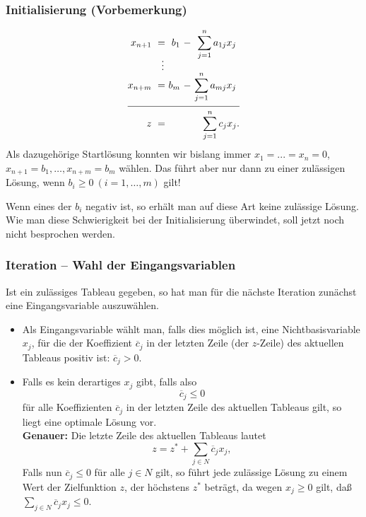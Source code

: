 \documentclass[smaller]{beamer}
\begin{document}
\begin{frame}
 \frametitle{Initialisierung (Vorbemerkung)}
 \begin{align*}
\begin{alignedat}{3}
x_{n+1} &\ = &\ b_1 &\ - &\ \sum\limits_{j=1}^{n}{a_{1j}x_j}\ \\[-3mm]
 &\ \ \ \vdots & & & \\[-2mm]
x_{n+m} &\ = &\ b_m &\ - &\ \sum\limits_{j=1}^{n}{a_{mj}x_j}\ \\ \cline{1-5}
z &\ = &\ & & \sum\limits_{j=1}^{n}{c_jx_j}.
\end{alignedat}
\end{align*}
Als dazugehörige Startlösung konnten wir bislang immer $x_1=...=x_n=0$, $x_{n+1}=b_1, \ldots, x_{n+m}=b_m$ wählen. Das führt aber nur dann zu einer zulässigen Lösung, wenn $b_i \geq 0\ (i=1,\ldots,m)$ gilt!

\alert{Wenn eines der $b_i$ negativ ist, so erhält man auf diese Art keine zulässige Lösung}. Wie man diese Schwierigkeit bei der Initialisierung überwindet, soll jetzt noch nicht besprochen werden.
\end{frame}

\begin{frame}
 \frametitle{Iteration -- Wahl der Eingangsvariablen}
 Ist ein zulässiges Tableau gegeben, so hat man für die nächste Iteration zunächst eine Eingangsvariable auszuwählen.
\begin{itemize}
 \item Als Eingangsvariable wählt man, falls dies möglich ist, eine Nichtbasisvariable $x_j$, für die der Koeffizient $\overline{c}_j$ in der letzten Zeile (der $z$-Zeile) des aktuellen Tableaus positiv ist: $\overline{c}_j > 0$.
 \item Falls es kein derartiges $x_j$ gibt, falls also
\[
\overline{c}_j \leq 0
\]
für alle Koeffizienten $\overline{c}_j$ in der letzten Zeile des aktuellen Tableaus gilt, \alert{so liegt eine optimale Lösung vor}. \\
\textbf{Genauer:} Die letzte Zeile des aktuellen Tableaus lautet
\[
z = z^* + \sum\limits_{j \in N}{\overline{c}_jx_j},
\]
Falls nun $\overline{c}_j \leq 0$ für alle $j \in N$ gilt, so führt jede zulässige Lösung zu einem Wert der Zielfunktion $z$, der höchstens $z^*$ beträgt, da wegen $x_j \ge 0$ gilt, daß $\sum\limits_{j \in N}{\overline{c}_jx_j} \leq 0$.
\end{itemize}
\end{frame}
\end{document}
